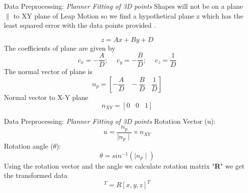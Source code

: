 \documentclass[10pt]{beamer}
\begin{document}
\begin{frame}{Data Preprocessing: \textit{Planner Fitting of 3D points} }
Shapes will not be on a plane $\parallel$ to XY plane of Leap Motion so we find a hypothetical plane z which has the least squared error with the data points provided \cite{eberly2000least}.

\begin{equation}
	z = A\textit{x} + B\textit{y} + D
\end{equation}
The coefficients of plane are given by 
\begin{equation*}
c_x = -\frac{A}{D};\hspace{15pt} c_y = - \frac{B}{D} ;\hspace{15pt} c_z = \frac{1}{D}
\end{equation*}
The normal vector of plane is 
\begin{equation}
n_p = [-\frac{A}{D} \hspace{10pt} -\frac{B}{D} \hspace{10pt} \frac{1}{D}] 
\end{equation}
Normal vector to X-Y plane 
\begin{equation*}
n_{XY} = [0\hspace{10pt}  0 \hspace{10pt}  1]
\end{equation*}
\end{frame}

\begin{frame}{Data Preprocessing: \textit{Planner Fitting of 3D points} }
Rotation Vector (u):
\begin{equation}
u = \frac{n_p}{\mid n_p \mid} \times n_{XY}
\end{equation}
Rotation angle ($\theta$):
\begin{equation}
\theta = sin^{-1} (\mid n_p \mid)
\end{equation}
Using the rotation vector and the angle we calculate rotation matrix "\textbf{R}" we get the transformed data
\begin{equation}
[x_{new},y_{new},z_{new}]^T  = R [x,y,z]^T
\end{equation}
\end{frame}
\end{document}
